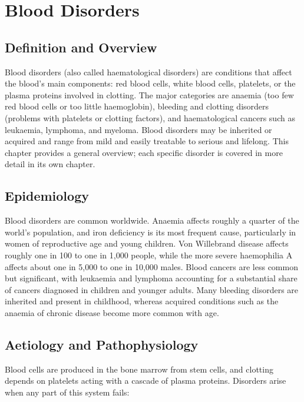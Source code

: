 \chapter{Blood Disorders}

\section*{Definition and Overview}
Blood disorders (also called haematological disorders) are conditions that affect the blood's main components: red blood cells, white blood cells, platelets, or the plasma proteins involved in clotting. The major categories are anaemia (too few red blood cells or too little haemoglobin), bleeding and clotting disorders (problems with platelets or clotting factors), and haematological cancers such as leukaemia, lymphoma, and myeloma. Blood disorders may be inherited or acquired and range from mild and easily treatable to serious and lifelong. This chapter provides a general overview; each specific disorder is covered in more detail in its own chapter.

\section*{Epidemiology}
Blood disorders are common worldwide. Anaemia affects roughly a quarter of the world's population, and iron deficiency is its most frequent cause, particularly in women of reproductive age and young children. Von Willebrand disease affects roughly one in 100 to one in 1,000 people, while the more severe haemophilia A affects about one in 5,000 to one in 10,000 males. Blood cancers are less common but significant, with leukaemia and lymphoma accounting for a substantial share of cancers diagnosed in children and younger adults. Many bleeding disorders are inherited and present in childhood, whereas acquired conditions such as the anaemia of chronic disease become more common with age.

\section*{Aetiology and Pathophysiology}
Blood cells are produced in the bone marrow from stem cells, and clotting depends on platelets acting with a cascade of plasma proteins. Disorders arise when any part of this system fails:


